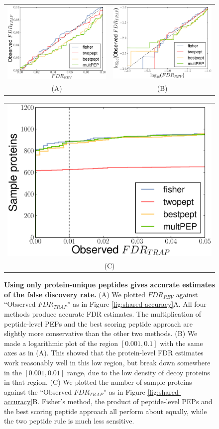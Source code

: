 \documentclass{article}
\begin{document}
\begin{figure}[!htp]
\begin{center}
\begin{tabular}{cc} 
\includegraphics[width=0.45\linewidth]{./img/unique-pept-accuracy} &
\includegraphics[width=0.45\linewidth]{./img/unique-pept-accuracy-log}
\\
(A) & (B)
\end{tabular}
\begin{tabular}{c}
\includegraphics[width=0.45\linewidth]{./img/unique-pept-performance}
\\
(C)
\end{tabular}
\caption{\label{fig:unique-accuracy}\textbf{Using only protein-unique
peptides gives accurate estimates of the false discovery rate.} (A) We
plotted $FDR_{REV}$ against ``Observed $FDR_{TRAP}$'' as in Figure
\ref{fig:shared-accuracy}A. All four methods produce
accurate FDR estimates. The multiplication of peptide-level PEPs and
the best scoring peptide approach are slightly more conservative than
the other two methods. (B) We made a logarithmic plot of the region
$[0.001, 0.1]$ with the same axes as in (A). This showed that the
protein-level FDR estimates work reasonably well in this low region,
but break down somewhere in the $[0.001, 0.01]$ range, due to the low
density of decoy proteins in that region. (C) We plotted the number of
sample proteins against the ``Observed $FDR_{TRAP}$'' as in Figure
\ref{fig:shared-accuracy}B. Fisher's method, the product of
peptide-level PEPs and the best scoring peptide approach all perform
about equally, while the two peptide rule is much less sensitive.}
\end{center}
\end{figure}
\end{document}

